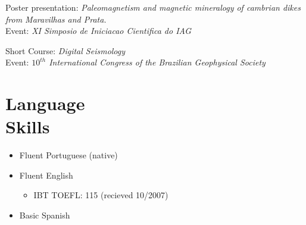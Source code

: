 \documentclass[margin,line]{resume}
\begin{document}
\begin{resume}
\begin{list1}
		\item[] Poster presentation: \textit{Paleomagnetism and magnetic mineralogy of cambrian dikes from Maravilhas and Prata.}\\ 
						Event: \textit{XI Simposio de Iniciacao Cientifica do IAG}\\        

		\item[] Short Course: \textit{Digital Seismology}\\
						Event: \textit{$10^{th}$ International Congress of the Brazilian Geophysical Society }

		\end{list1}
		
		
		
		\section{\mysidestyle Language\\Skills}
		
		\begin{itemize}
			\item Fluent Portuguese (native)
			\item Fluent English 
			\begin{itemize}
				\item IBT TOEFL: 115 (recieved 10/2007)
			\end{itemize}
			\item Basic Spanish			
		\end{itemize}


    

    



\end{resume}
\end{document}
